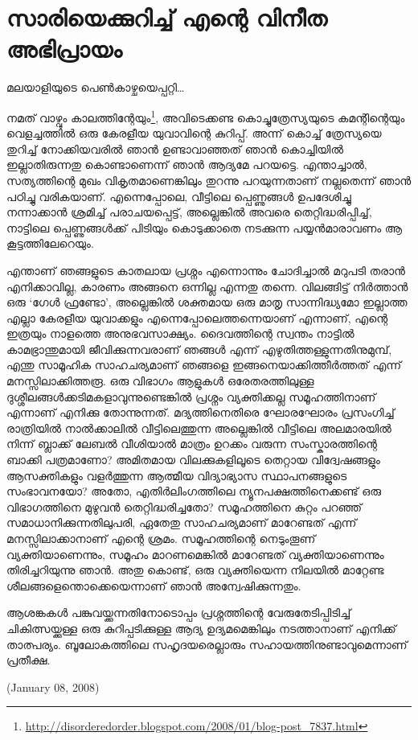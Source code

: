 \section*{സാരിയെക്കുറിച്ച് എന്റെ വിനീത അഭിപ്രായം}
\vskip 2pt


മലയാളിയുടെ പെണ്‍കാഴ്ചയെപ്പറ്റി…

നമത് വാഴ്വും കാലത്തിന്റേയും\footnote{\url{http://disorderedorder.blogspot.com/2008/01/blog-post_7837.html}}, അവിടെക്കണ്ട കൊച്ചുത്രേസ്യയുടെ കമന്റിന്റെയും വെളച്ചത്തില്‍ ഒരു കേരളീയ യുവാവിന്റെ കുറിപ്പ്. അന്ന് കൊച്ച് ത്രേസ്യയെ തുറിച്ച് നോക്കിയവരില്‍ ഞാന്‍ ഉണ്ടാവാഞ്ഞത് ഞാന്‍ കൊച്ചിയില്‍ ഇല്ലാതിരുന്നതു കൊണ്ടാണെന്ന് ഞാന്‍ ആദ്യമേ പറയട്ടെ. എന്താച്ചാല്‍, സത്യത്തിന്റെ മുഖം വികൃതമാണെങ്കിലും തുറന്നു പറയുന്നതാണ് നല്ലതെന്ന് ഞാന്‍ പഠിച്ചു വരികയാണ്. എന്നെപ്പോലെ, വീട്ടിലെ പ്പെണ്ണുങ്ങള്‍ ഉപദേശിച്ചു നന്നാക്കാന്‍ ശ്രമിച്ച് പരാചയപ്പെട്ട്, അല്ലെങ്കില്‍ അവരെ തെറ്റിദ്ധരിപ്പിച്ച്, നാട്ടിലെ പ്പെണ്ണുങ്ങള്‍ക്ക് പിടിയും കൊടുക്കാതെ നടക്കുന്ന പയ്യന്‍മാരാവണം ആ കൂട്ടത്തിലേറെയും.

എന്താണ് ഞങ്ങളുടെ കാതലായ പ്രശ്നം എന്നൊന്നും ചോദിച്ചാല്‍ മറുപടി തരാന്‍ എനിക്കാവില്ല, കാരണം അങ്ങനെ ഒന്നില്ല എന്നതു തന്നെ. വിലങ്ങിട്ട് നിര്‍ത്താന്‍ ഒരു ‘ഗേള്‍ ഫ്രണ്ടോ’, അല്ലെങ്കില്‍ ശക്തമായ ഒരു മാതൃ സാന്നിദ്ധ്യമോ ഇല്ലാത്ത എല്ലാ കേരളീയ യുവാക്കളും എന്നെപ്പോലെത്തന്നെയാണ് എന്നാണ്, എന്റെ ഇത്രയും നാളത്തെ അനുഭവസാക്ഷ്യം. ദൈവത്തിന്റെ സ്വന്തം നാട്ടില്‍ കാമഭ്രാന്തുമായി ജീവിക്കുന്നവരാണ് ഞങ്ങള്‍ എന്ന് എഴുതിത്തള്ളുന്നതിനുമുമ്പ്, എന്തു സാമൂഹിക സാഹചര്യമാണ് ഞങ്ങളെ ഇങ്ങനെയാക്കിത്തീര്‍ത്തത് എന്ന് മനസ്സിലാക്കിത്തരൂ. ഒരു വിഭാഗം ആളുകള്‍ ഒരേതരത്തിലുള്ള ദുശ്ശീലങ്ങള്‍ക്കടിമകളാവുന്നുണ്ടെങ്കില്‍ പ്രശ്നം വ്യക്തിക്കല്ല സമൂഹത്തിനാണ് എന്നാണ് എനിക്കു തോന്നുന്നത്. മദ്യത്തിനെതിരെ ഘോരഘോരം പ്രസംഗിച്ച് രാത്രിയില്‍ നാല്‍ക്കാലില്‍ വീട്ടിലെത്തുന്ന അല്ലെങ്കില്‍ വീട്ടിലെ അലമാരയില്‍ നിന്ന് ബ്ലാക്ക് ലേബല്‍ വീശിയാല്‍ മാത്രം ഉറക്കം വരുന്ന സംസ്കാരത്തിന്റെ ബാക്കി പത്രമാണോ? അമിതമായ വിലക്കുകളിലൂടെ തെറ്റായ വിദ്വേഷങ്ങളും ആസക്തികളും വളര്‍ത്തുന്ന ആത്മീയ വിദ്യാഭ്യാസ സ്ഥാപനങ്ങളുടെ സംഭാവനയോ? അതോ, എതിര്‍ലിംഗത്തിലെ ന്യൂനപക്ഷത്തിനെക്കണ്ട് ഒരു വിഭാഗത്തിനെ മുഴുവന്‍ തെറ്റിദ്ധരിച്ചതോ? സമൂഹത്തിനെ കുറ്റം പറഞ്ഞ് സമാധാനിക്കുന്നതിലുപരി, ഏതേതു സാഹചര്യമാണ് മാറേണ്ടത് എന്ന് മനസ്സിലാക്കാനാണ് എന്റെ ശ്രമം. സമൂഹത്തിന്റെ നെടുംതൂണ് വ്യക്തിയാണെന്നും, സമൂഹം മാറണമെങ്കില്‍ മാറേണ്ടത് വ്യക്തിയാണെന്നും തിരിച്ചറിയുന്നു ഞാന്‍. അതു കൊണ്ട്, ഒരു വ്യക്തിയെന്ന നിലയില്‍ മാറ്റേണ്ട ശീലങ്ങളെന്തൊക്കെയെന്നാണ് ഞാന്‍ അന്വേഷിക്കുന്നതും.

ആശങ്കകള്‍ പങ്കുവയ്ക്കുന്നതിനോടൊപ്പം പ്രശ്നത്തിന്റെ വേരുതേടിപ്പിടിച്ച് ചികിത്സയ്ക്കുള്ള ഒരു കുറിപ്പടിക്കുള്ള ആദ്യ ഉദ്യമമെങ്കിലും നടത്താനാണ് എനിക്ക് താത്പര്യം. ബൂലോകത്തിലെ സഹൃദയരെല്ലാരും സഹായത്തിനുണ്ടാവുമെന്നാണ് പ്രതീക്ഷ.

(January 08, 2008)
\newpage

